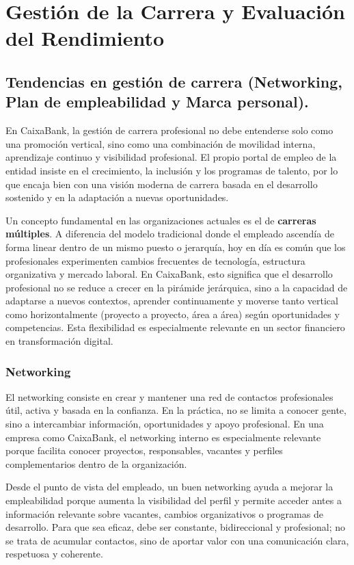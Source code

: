 \chapter{Gestión de la Carrera y Evaluación del Rendimiento}

\section{Tendencias en gestión de carrera (Networking, Plan de empleabilidad y Marca personal).}

En CaixaBank, la gestión de carrera profesional no debe entenderse solo como una promoción vertical, sino como una combinación de movilidad interna, aprendizaje continuo y visibilidad profesional. El propio portal de empleo de la entidad insiste en el crecimiento, la inclusión y los programas de talento, por lo que encaja bien con una visión moderna de carrera basada en el desarrollo sostenido y en la adaptación a nuevas oportunidades.

Un concepto fundamental en las organizaciones actuales es el de \textbf{carreras múltiples}. A diferencia del modelo tradicional donde el empleado ascendía de forma linear dentro de un mismo puesto o jerarquía, hoy en día es común que los profesionales experimenten cambios frecuentes de tecnología, estructura organizativa y mercado laboral. En CaixaBank, esto significa que el desarrollo profesional no se reduce a crecer en la pirámide jerárquica, sino a la capacidad de adaptarse a nuevos contextos, aprender continuamente y moverse tanto vertical como horizontalmente (proyecto a proyecto, área a área) según oportunidades y competencias. Esta flexibilidad es especialmente relevante en un sector financiero en transformación digital.

\subsection{Networking}
El networking consiste en crear y mantener una red de contactos profesionales útil, activa y basada en la confianza. En la práctica, no se limita a conocer gente, sino a intercambiar información, oportunidades y apoyo profesional. En una empresa como CaixaBank, el networking interno es especialmente relevante porque facilita conocer proyectos, responsables, vacantes y perfiles complementarios dentro de la organización.

Desde el punto de vista del empleado, un buen networking ayuda a mejorar la empleabilidad porque aumenta la visibilidad del perfil y permite acceder antes a información relevante sobre vacantes, cambios organizativos o programas de desarrollo. Para que sea eficaz, debe ser constante, bidireccional y profesional; no se trata de acumular contactos, sino de aportar valor con una comunicación clara, respetuosa y coherente.

